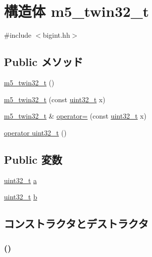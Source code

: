 \hypertarget{structm5__twin32__t}{
\section{構造体 m5\_\-twin32\_\-t}
\label{structm5__twin32__t}
}


{\ttfamily \#include $<$bigint.hh$>$}\subsection*{Public メソッド}
\begin{DoxyCompactItemize}
\item 
\hyperlink{structm5__twin32__t_a18b6fb113dc7999d2ef31963399a5592}{m5\_\-twin32\_\-t} ()
\item 
\hyperlink{structm5__twin32__t_ada9e89b2bf229d9b1f59fbe70d581d38}{m5\_\-twin32\_\-t} (const \hyperlink{Type_8hh_a435d1572bf3f880d55459d9805097f62}{uint32\_\-t} x)
\item 
\hyperlink{structm5__twin32__t}{m5\_\-twin32\_\-t} \& \hyperlink{structm5__twin32__t_a0db32bac69e8c26d5901895896474601}{operator=} (const \hyperlink{Type_8hh_a435d1572bf3f880d55459d9805097f62}{uint32\_\-t} x)
\item 
\hyperlink{structm5__twin32__t_a9e5f55cf6004b9dd31ffa23eea2da593}{operator uint32\_\-t} ()
\end{DoxyCompactItemize}
\subsection*{Public 変数}
\begin{DoxyCompactItemize}
\item 
\hyperlink{Type_8hh_a435d1572bf3f880d55459d9805097f62}{uint32\_\-t} \hyperlink{structm5__twin32__t_a0a0390ed59a97feb6783f87db4086a7c}{a}
\item 
\hyperlink{Type_8hh_a435d1572bf3f880d55459d9805097f62}{uint32\_\-t} \hyperlink{structm5__twin32__t_a2826644ea978cb49c4ee809b55e128d7}{b}
\end{DoxyCompactItemize}


\subsection{コンストラクタとデストラクタ}
\hypertarget{structm5__twin32__t_a18b6fb113dc7999d2ef31963399a5592}{
\subsubsection[{m5\_\-twin32\_\-t}]{ ()}}
\label{structm5__twin32__t_a18b6fb113dc7999d2ef31963399a5592}



